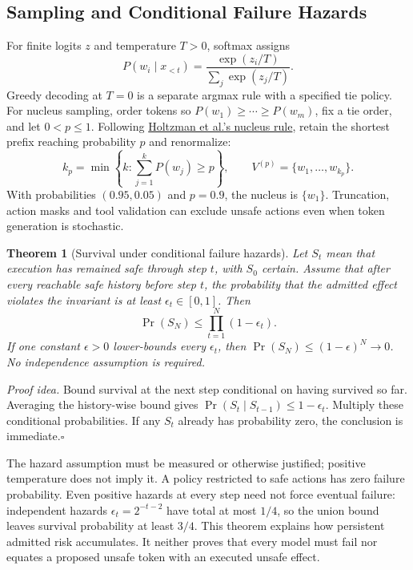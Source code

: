\documentclass[11pt,a4paper]{article}
\newtheorem{theorem}{Theorem}[section]
\begin{document}
\subsection{Sampling and Conditional Failure Hazards}

For finite logits $z$ and temperature $T>0$, softmax assigns
\begin{equation}
P(w_i\mid x_{<t})=\frac{\exp(z_i/T)}{\sum_j\exp(z_j/T)}.
\end{equation}
Greedy decoding at $T=0$ is a separate argmax rule with a specified tie policy. For nucleus sampling, order tokens so $P(w_1)\ge\cdots\ge P(w_m)$, fix a tie order, and let $0<p\le1$. Following \href{https://arxiv.org/abs/1904.09751}{Holtzman et al.'s nucleus rule}, retain the shortest prefix reaching probability $p$ and renormalize:
\begin{equation}
k_p=\min\left\{k:\sum_{j=1}^{k}P(w_j)\ge p\right\},\qquad
V^{(p)}=\{w_1,\ldots,w_{k_p}\}.
\end{equation}
With probabilities $(0.95,0.05)$ and $p=0.9$, the nucleus is $\{w_1\}$. Truncation, action masks and tool validation can exclude unsafe actions even when token generation is stochastic.

\begin{theorem}[Survival under conditional failure hazards]\label{thm:non-determinism}
Let $S_t$ mean that execution has remained safe through step $t$, with $S_0$ certain. Assume that after every reachable safe history before step $t$, the probability that the \emph{admitted effect} violates the invariant is at least $\epsilon_t\in[0,1]$. Then
\begin{equation}
\Pr(S_N)\le\prod_{t=1}^{N}(1-\epsilon_t).
\end{equation}
If one constant $\epsilon>0$ lower-bounds every $\epsilon_t$, then $\Pr(S_N)\le(1-\epsilon)^N\to0$. No independence assumption is required.
\end{theorem}
\noindent\textit{Proof idea.} Bound survival at the next step conditional on having survived so far. Averaging the history-wise bound gives $\Pr(S_t\mid S_{t-1})\le1-\epsilon_t$. Multiply these conditional probabilities. If any $S_t$ already has probability zero, the conclusion is immediate.\hfill$\square$

The hazard assumption must be measured or otherwise justified; positive temperature does not imply it. A policy restricted to safe actions has zero failure probability. Even positive hazards at every step need not force eventual failure: independent hazards $\epsilon_t=2^{-t-2}$ have total at most $1/4$, so the union bound leaves survival probability at least $3/4$. This theorem explains how persistent admitted risk accumulates. It neither proves that every model must fail nor equates a proposed unsafe token with an executed unsafe effect.
\end{document}
